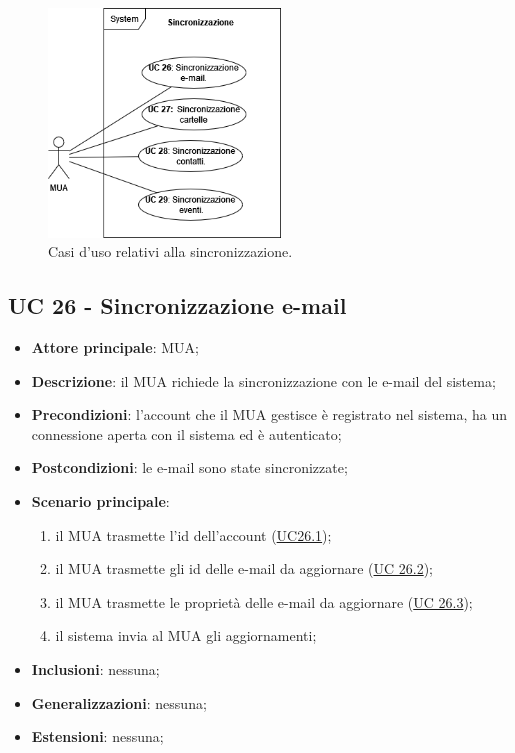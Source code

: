 
\begin{figure}[H]
    \includegraphics[width=0.55\textwidth]{sections/uc_imgs/UC-sincronizzazione.png}
    \centering
    \caption{Casi d'uso relativi alla sincronizzazione.}
\end{figure}

\subsection{UC 26 - Sincronizzazione e-mail} \label{sec:UC26}
    
    \begin{itemize}
        \item \textbf{Attore principale}: MUA;
        \item \textbf{Descrizione}: il MUA richiede la sincronizzazione con le e-mail del sistema;
        \item \textbf{Precondizioni}: l’account che il MUA gestisce è registrato nel sistema, ha un connessione aperta con il sistema ed è autenticato;
        \item \textbf{Postcondizioni}: le e-mail sono state sincronizzate;
        \item \textbf{Scenario principale}:
            \begin{enumerate}
                \item il MUA trasmette l'id dell'account (\hyperref[sec:UC26.1]{UC26.1});
                \item il MUA trasmette gli id delle e-mail da aggiornare (\hyperref[sec:UC26.2]{UC 26.2});
                \item il MUA trasmette le proprietà delle e-mail da aggiornare (\hyperref[sec:UC26.3]{UC 26.3});
                \item il sistema invia al MUA gli aggiornamenti;
            \end{enumerate}
        \item \textbf{Inclusioni}: nessuna;
        \item \textbf{Generalizzazioni}: nessuna;
        \item \textbf{Estensioni}: nessuna;
    \end{itemize}

